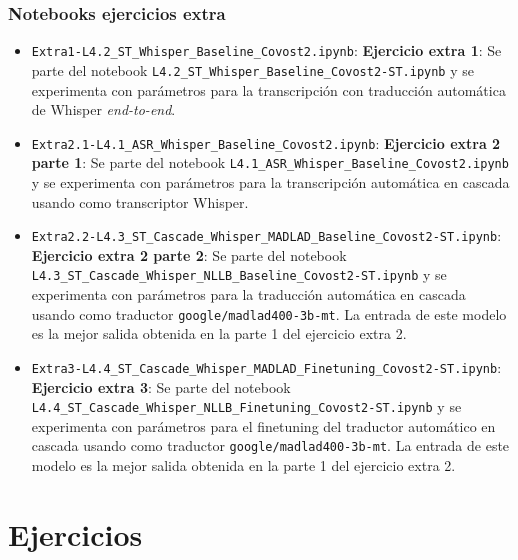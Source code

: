\documentclass[11pt,spanish,listoffigures,listoftables]{tfgetsinf}
\begin{document}
\subsection{Notebooks ejercicios extra}
\begin{itemize}

  \item \texttt{Extra1-L4.2\_ST\_Whisper\_Baseline\_Covost2.ipynb}: \textbf{Ejercicio extra 1}: Se parte del notebook \texttt{L4.2\_ST\_Whisper\_Baseline\_Covost2-ST.ipynb} y se experimenta con parámetros para la transcripción con traducción automática de Whisper \textit{end-to-end}.
  \item \texttt{Extra2.1-L4.1\_ASR\_Whisper\_Baseline\_Covost2.ipynb}: \textbf{Ejercicio extra 2 parte 1}: Se parte del notebook \texttt{L4.1\_ASR\_Whisper\_Baseline\_Covost2.ipynb} y se experimenta con parámetros para la transcripción automática en cascada usando como transcriptor Whisper.
  \item \texttt{Extra2.2-L4.3\_ST\_Cascade\_Whisper\_MADLAD\_Baseline\_Covost2-ST.ipynb}: \textbf{Ejercicio extra 2 parte 2}: Se parte del notebook \texttt{L4.3\_ST\_Cascade\_Whisper\_NLLB\_Baseline\_Covost2-ST.ipynb} y se experimenta con parámetros para la traducción automática en cascada usando como traductor \texttt{google/madlad400-3b-mt}\cite{kudugunta2023madlad}. La entrada de este modelo es la mejor salida obtenida en la parte 1 del ejercicio extra 2.
  \item \texttt{Extra3-L4.4\_ST\_Cascade\_Whisper\_MADLAD\_Finetuning\_Covost2-ST.ipynb}: \textbf{Ejercicio extra 3}: Se parte del notebook \texttt{L4.4\_ST\_Cascade\_Whisper\_NLLB\_Finetuning\_Covost2-ST.ipynb} y se experimenta con parámetros para el finetuning del traductor automático en cascada usando como traductor \texttt{google/madlad400-3b-mt}\cite{kudugunta2023madlad}. La entrada de este modelo es la mejor salida obtenida en la parte 1 del ejercicio extra 2.
\end{itemize}


\chapter{Ejercicios}
\end{document}
